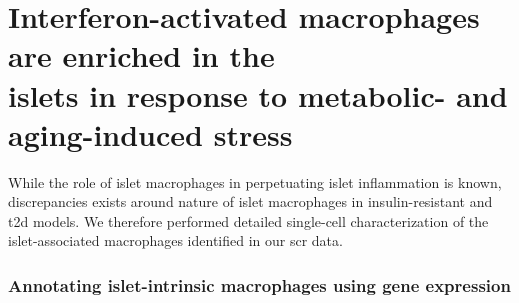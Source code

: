 \clearpage

\section[\glsentryshort{ifn}-activated macrophages are enriched in the islets in response to metabolic- and aging-induced stress]{Interferon-activated macrophages are enriched in the\\islets in response to metabolic- and aging-induced stress}
\label{sec:chp2_sc_macs}


While the role of islet macrophages in perpetuating islet inflammation is known, discrepancies exists around nature of islet macrophages in insulin-resistant and \gls{t2d} models. We therefore performed detailed single-cell characterization of the islet-associated macrophages identified in our \gls{scr} data. 

\subsubsection{\large Annotating islet-intrinsic macrophages using gene expression}
 
